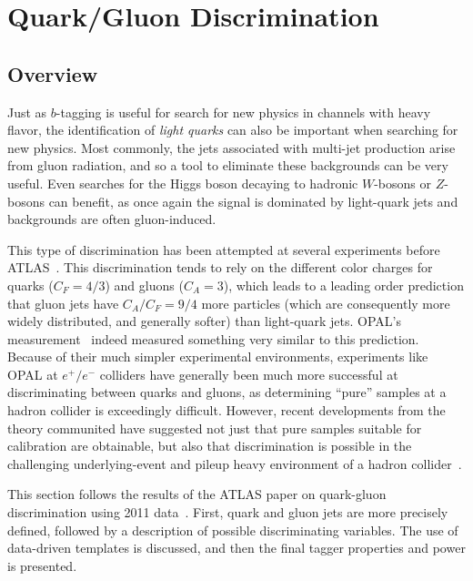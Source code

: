 
\section{Quark/Gluon Discrimination}
\label{jet-reconstruction:qg}
\subsection{Overview}
\label{jet-reconstruction:qg:overview}

Just as $b$-tagging is useful for search for new physics in channels with heavy flavor, the identification of \textit{light quarks} can also be important when searching for new physics. Most commonly, the jets associated with multi-jet production arise from gluon radiation, and so a tool to eliminate these backgrounds can be very useful. Even searches for the Higgs boson decaying to hadronic $W$-bosons or $Z$-bosons can benefit, as once again the signal is dominated by light-quark jets and backgrounds are often gluon-induced.

This type of discrimination has been attempted at several experiments before ATLAS~\cite{TevatronShapes1,QGNN,Pumplin,QGopal,Ariel,QGsub,QGlep,QGcleo,DelphiQG,DelphiQG2,AlephQG,L3QG}. This discrimination tends to rely on the different color charges for quarks ($C_F=4/3$) and gluons ($C_A=3$), which leads to a leading order prediction that gluon jets have $C_A/C_F = 9/4$ more particles (which are consequently more widely distributed, and generally softer) than light-quark jets. OPAL's measurement~\cite{QGopal} indeed measured something very similar to this prediction. Because of their much simpler experimental environments, experiments like OPAL at $e^+/e^-$ colliders have generally been much more successful at discriminating between quarks and gluons, as determining ``pure'' samples at a hadron collider is exceedingly difficult. However, recent developments from the theory communited have suggested not just that pure samples suitable for calibration are obtainable, but also that discrimination is possible in the challenging underlying-event and pileup heavy environment of a hadron collider~\cite{schwartz1,schwartz2}.

This section follows the results of the ATLAS paper on quark-gluon discrimination using 2011 data~\cite{ATLASqg}. First, quark and gluon jets are more precisely defined, followed by a description of possible discriminating variables. The use of data-driven templates is discussed, and then the final tagger properties and power is presented.

